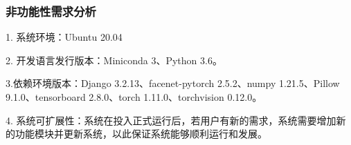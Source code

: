 \subsubsection{非功能性需求分析}

1. 系统环境：Ubuntu 20.04

2. 开发语言发行版本：Miniconda 3、Python 3.6。

3.依赖环境版本：Django 3.2.13、facenet-pytorch 2.5.2、numpy 1.21.5、Pillow 9.1.0、tensorboard 2.8.0、torch 1.11.0、torchvision 0.12.0。

4. 系统可扩展性：系统在投入正式运行后，若用户有新的需求，系统需要增加新的功能模块并更新系统，以此保证系统能够顺利运行和发展。





